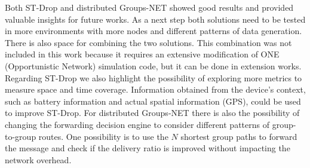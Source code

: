 Both ST-Drop and distributed Groups-NET showed good results and provided valuable insights for future works. As a next step both solutions need to be tested in more environments with more nodes and different patterns of data generation. There is also space for combining the two solutions. This combination was not included in this work because it requires an extensive modification of ONE (Opportunistic Network) simulation code, but it can be done in extension works. Regarding ST-Drop we also highlight the possibility of exploring more metrics to measure space and time coverage. Information obtained from the device's context, such as battery information and actual spatial information (GPS), could be used to improve ST-Drop. For distributed Groups-NET there is also the possibility of changing the forwarding decision engine to consider different patterns of group-to-group routes. One possibility is to use the $N$ shortest group paths to forward the message and check if the delivery ratio is improved without impacting the network overhead.